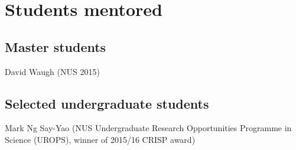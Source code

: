 \section*{Students mentored }

\subsection*{Master students }

David Waugh (NUS 2015)

\subsection*{Selected undergraduate students }

Mark Ng Say-Yao (NUS Undergraduate Research Opportunities Programme in Science (UROPS), winner of 2015/16 CRISP award)


